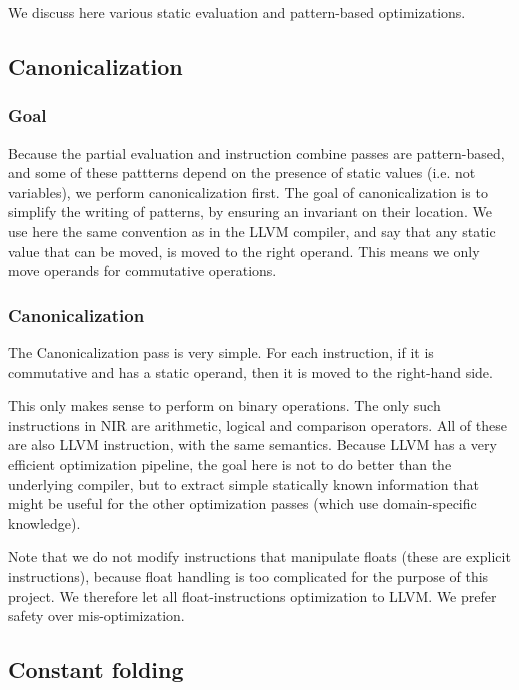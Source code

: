 \documentclass[12pt,a4paper]{article}
\newcommand{\scala}[1]{\textsf{#1}}
\begin{document}
We discuss here various static evaluation and pattern-based optimizations.

\subsection{Canonicalization}


\subsubsection*{Goal}

Because the partial evaluation and instruction combine passes are pattern-based, and some of these pattterns depend on the presence of static values (i.e. not variables), we perform canonicalization first. The goal of canonicalization is to simplify the writing of patterns, by ensuring an invariant on their location. We use here the same convention as in the LLVM compiler, and say that any static value that can be moved, is moved to the right operand. This means we only move operands for commutative operations.

\subsubsection*{Canonicalization}

The \scala{Canonicalization} pass is very simple. For each instruction, if it is commutative and has a static operand, then it is moved to the right-hand side.

This only makes sense to perform on binary operations. The only such instructions in NIR are arithmetic, logical and comparison operators. All of these are also LLVM instruction, with the same semantics. Because LLVM has a very efficient optimization pipeline, the goal here is not to do better than the underlying compiler, but to extract simple statically known information that might be useful for the other optimization passes (which use domain-specific knowledge).

Note that we do not modify instructions that manipulate floats (these are explicit instructions), because float handling is too complicated for the purpose of this project. We therefore let all float-instructions optimization to LLVM. We prefer safety over mis-optimization.

\subsection{Constant folding}
\end{document}
